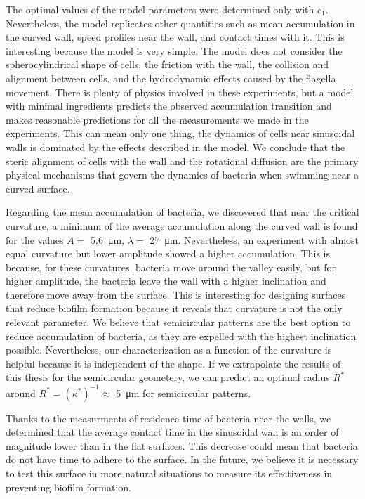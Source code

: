 The optimal values of the model parameters were determined only with $c_1$. Nevertheless, the model replicates other quantities such as mean accumulation in the curved wall, speed profiles near the wall, and contact times with it. This is interesting because the model is very simple. The model does not consider the spherocylindrical shape of cells, the friction with the wall, the collision and alignment between cells, and the hydrodynamic effects caused by the flagella movement. There is plenty of physics involved in these experiments, but a model with minimal ingredients predicts the observed accumulation transition and makes reasonable predictions for all the measurements we made in the experiments. This can mean only one thing, the dynamics of cells near sinusoidal walls is dominated by the effects described in the model. We conclude that the steric alignment of cells with the wall and the rotational diffusion are the primary physical mechanisms that govern the dynamics of bacteria when swimming near a curved surface.

Regarding the mean accumulation of bacteria, we discovered that near the critical curvature, a minimum of the average accumulation along the curved wall is found for the values $A=$ \SI{5.6}{\micro\meter}, $\lambda= $ \SI{27}{\micro\meter}. Nevertheless, an experiment with almost equal curvature but lower amplitude showed a higher accumulation. This is because, for these curvatures, bacteria move around the valley easily, but for higher amplitude, the bacteria leave the wall with a higher inclination and therefore move away from the surface. This is interesting for designing surfaces that reduce biofilm formation because it reveals that curvature is not the only relevant parameter. We believe that semicircular patterns are the best option to reduce accumulation of bacteria, as they are expelled with the highest inclination possible. Nevertheless, our characterization as a function of the curvature is helpful because it is independent of the shape. If we extrapolate the results of this thesis for the semicircular geometery, we can predict an optimal radius $R^*$ around $R^*=(\kappa^*)^{-1}\approx$ \SI{5}{\micro\meter} for semicircular patterns.

Thanks to the measurments of residence time of bacteria near the walls, we determined that the average contact time in the sinusoidal wall is an order of magnitude lower than in the flat surfaces. This decrease could mean that bacteria do not have time to adhere to the surface. In the future, we believe it is necessary to test this surface in more natural situations to measure its effectiveness in preventing biofilm formation. 


